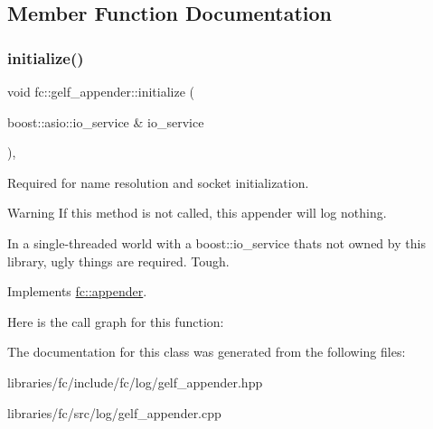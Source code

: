 \subsection{Member Function Documentation}
\mbox{\label{classfc_1_1gelf__appender_ab6509d82a033f86a7066849841465ff0}} 
\subsubsection{\texorpdfstring{initialize()}{initialize()}}
{\footnotesize\ttfamily void fc\+::gelf\+\_\+appender\+::initialize (\begin{DoxyParamCaption}\item[{boost\+::asio\+::io\+\_\+service \&}]{io\+\_\+service }\end{DoxyParamCaption})\hspace{0.3cm}{\ttfamily [override]}, {\ttfamily [virtual]}}



Required for name resolution and socket initialization. 

\begin{DoxyWarning}{Warning}
If this method is not called, this appender will log nothing.
\end{DoxyWarning}
In a single-\/threaded world with a boost\+::io\+\_\+service that\textquotesingle{}s not owned by this library, ugly things are required. Tough. 

Implements \mbox{\hyperlink{classfc_1_1appender}{fc\+::appender}}.

Here is the call graph for this function\+:


The documentation for this class was generated from the following files\+:\begin{DoxyCompactItemize}
\item 
libraries/fc/include/fc/log/gelf\+\_\+appender.\+hpp\item 
libraries/fc/src/log/gelf\+\_\+appender.\+cpp\end{DoxyCompactItemize}
